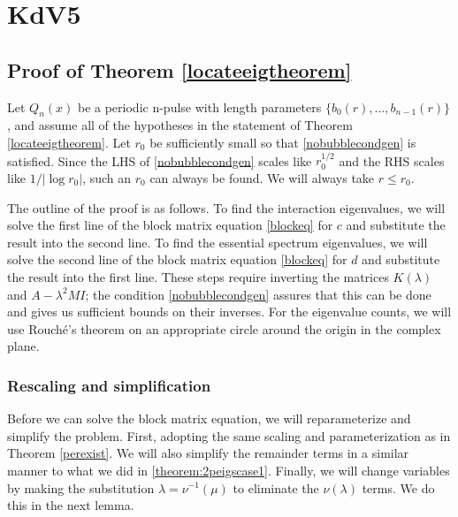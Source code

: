 \documentclass[thesis.tex]{subfiles}
\begin{document}
\iffulldocument\else
	\chapter{KdV5}
\fi

\section{Proof of Theorem \ref{locateeigtheorem}}

Let $Q_n(x)$ be a periodic n-pulse with length parameters $\{ b_0(r), \dots, b_{n-1}(r)\}$, and assume all of the hypotheses in the statement of Theorem \ref{locateeigtheorem}. Let $r_0$ be sufficiently small so that \cref{nobubblecondgen} is satisfied. Since the LHS of \cref{nobubblecondgen} scales like $r_0^{1/2}$ and the RHS scales like $1/|\log r_0|$, such an $r_0$ can always be found. We will always take $r \leq r_0$.

The outline of the proof is as follows. To find the interaction eigenvalues, we will solve the first line of the block matrix equation \cref{blockeq} for $c$ and substitute the result into the second line. To find the essential spectrum eigenvalues, we will solve the second line of the block matrix equation \cref{blockeq} for $d$ and substitute the result into the first line. These steps require inverting the matrices $K(\lambda)$ and $A - \lambda^2 M I$; the condition \cref{nobubblecondgen} assures that this can be done and gives us sufficient bounds on their inverses. For the eigenvalue counts, we will use Rouch\'e's theorem on an appropriate circle around the origin in the complex plane.

\subsection{Rescaling and simplification}

Before we can solve the block matrix equation, we will reparameterize and simplify the problem. First, adopting the same scaling and parameterization as in Theorem \ref{perexist}. We will also simplify the remainder terms in a similar manner to what we did in \cref{theorem:2peigscase1}. Finally, we will change variables by making the substitution $\lambda = \nu^{-1}(\mu)$ to eliminate the $\nu(\lambda)$ terms. We do this in the next lemma.
\end{document}
